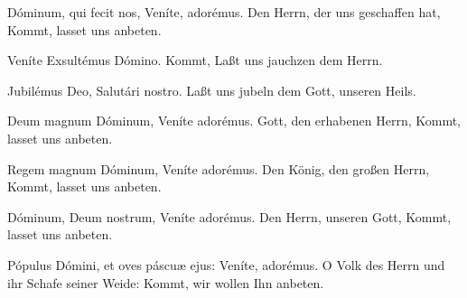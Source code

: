 \documentclass[fontsize=9pt,paper=A6,twoside,BCOR=1mm,DIV=22,headinclude]{scrarticle}
\begin{document}
\begin{paracol}{2}\pcb
	Dóminum, qui fecit nos, \red{*} Veníte, adorémus.
	\switchcolumn
	Den Herrn, der uns geschaffen hat, \red{*} Kommt, lasset uns anbeten.
\end{paracol}

\begin{paracol}{2}\pcb
	Veníte \red{*} Exsultémus Dómino.
	\switchcolumn 
	Kommt, \red{*} Laßt uns jauchzen dem Herrn.
\end{paracol}
\vspace{.6em}

\begin{paracol}{2}\pcb
	Jubilémus Deo, \red{*} Salutári nostro.
	\switchcolumn 
	Laßt uns jubeln dem Gott, \red{*} unseren Heils.
\end{paracol}

\pagebreak
{}
\begin{paracol}{2}\pcb
	Deum magnum Dóminum, \red{*} Veníte adorémus.
	\switchcolumn 
	Gott, den erhabenen Herrn, \red{*} Kommt, lasset uns anbeten.
\end{paracol}

\begin{paracol}{2}\pcb
	Regem magnum Dóminum, \red{*} Veníte adorémus.
	\switchcolumn 
	Den König, den großen Herrn, \red{*} Kommt, lasset uns anbeten.
\end{paracol}

\begin{paracol}{2}\pcb
	Dóminum, Deum nostrum, \red{*} Veníte adorémus.
	\switchcolumn 
	Den Herrn, unseren Gott, \red{*} Kommt, lasset uns anbeten.
\end{paracol}

\begin{paracol}{2}\pcb
	Pópulus Dómini, et oves páscuæ ejus: \red{*} Veníte, adorémus.
	\switchcolumn 
	O Volk des Herrn und ihr Schafe seiner Weide: \red{*} Kommt, wir wollen Ihn anbeten.
\end{paracol}
\end{document}
